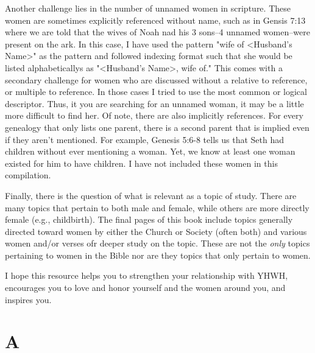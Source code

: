\documentclass[12pt,letter,twoside,openany]{extbook}
\begin{document}
Another challenge lies in the number of unnamed women in scripture. These women are sometimes explicitly referenced without name, such as in Gensis 7:13 where we are told that the wives of Noah nad his 3 sons--4 unnamed women--were present on the ark. In this case, I have used the pattern "wife of <Husband's Name>" as the pattern and followed indexing format such that she would be listed alphabeticallys as "<Husband's Name>, wife of."  This comes with a secondary challenge for women who are discussed without a relative to reference, or multiple to reference. In those cases I tried to use the most common or logical descriptor. Thus, it you are searching for an unnamed woman, it may be a little more difficult to find her. Of note, there  are also implicitly references. For every genealogy that only lists one parent, there is a second parent that is implied even if they aren't mentioned. For example, Genesis 5:6-8 tells us that Seth had children without ever mentioning a woman. Yet, we know at least one woman existed for him to have children. I have not included these women in this compilation.

Finally, there is the question of what is relevant as a topic of study. There are many topics that pertain to both male and female, while others are more directly female (e.g., childbirth). The final pages of this book include topics generally directed toward women by either the Church or Society (often both) and various women and/or verses ofr deeper study on the topic. These are not the \textit{only} topics pertaining to women in the Bible nor are they topics that only pertain to women.  

I hope this resource helps you to strengthen your relationship with YHWH, encourages you to love and honor yourself and the women around you, and inspires you.


\mainmatter	
\chapter*{A}
\end{document}
